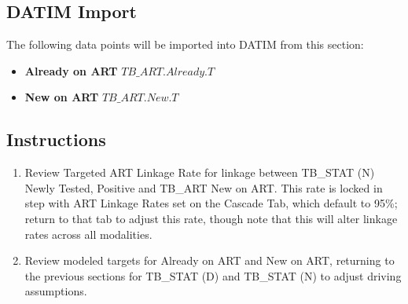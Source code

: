 \documentclass[
  openany]{book}
\begin{document}
\begin{table}
\centering\begingroup\fontsize{12}{14}\selectfont

\endgroup{}
\end{table}

\hypertarget{datim-import-26}{%
\subsection{DATIM Import}\label{datim-import-26}}

The following data points will be imported into DATIM from this section:

\begin{itemize}
\item
  \textbf{Already on ART} \(TB\_ART.Already.T\)
\item
  \textbf{New on ART} \(TB\_ART.New.T\)
\end{itemize}

\hypertarget{instructions-26}{%
\subsection{Instructions}\label{instructions-26}}

\begin{enumerate}
\def\labelenumi{\arabic{enumi}.}
\item
  Review Targeted ART Linkage Rate for linkage between TB\_STAT (N)
  Newly Tested, Positive and TB\_ART New on ART. This rate is locked in
  step with ART Linkage Rates set on the Cascade Tab, which default to
  95\%; return to that tab to adjust this rate, though note that this
  will alter linkage rates across all modalities.
\item
  Review modeled targets for Already on ART and New on ART, returning
  to the previous sections for TB\_STAT (D) and TB\_STAT (N) to adjust
  driving assumptions.
\end{enumerate}
\end{document}
